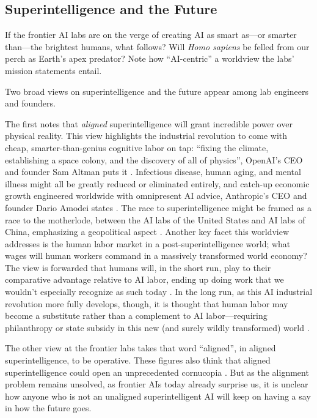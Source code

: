 \subsection{Superintelligence and the Future}
If the frontier AI labs are on the verge of creating AI as smart as---or
smarter than---the brightest humans, what follows? Will \emph{Homo sapiens} be
felled from our perch as Earth's apex predator? Note how ``AI-centric'' a
worldview the labs' mission statements entail.

Two broad views on superintelligence and the future appear among lab engineers
and founders.

The first notes that \emph{aligned} superintelligence will grant incredible
power over physical reality. This view highlights the industrial revolution to
come with cheap, smarter-than-genius cognitive labor on tap: ``fixing the
climate, establishing a space colony, and the discovery of all of physics'',
OpenAI's CEO and founder Sam Altman puts it \cite{altman2024intelligence}.
Infectious disease, human aging, and mental illness might all be greatly
reduced or eliminated entirely, and catch-up economic growth engineered
worldwide with omnipresent AI advice, Anthropic's CEO and founder Dario Amodei
states \cite{amodei2024grace}. The race to superintelligence might be framed as
a race to the motherlode, between the AI labs of the United States and AI labs
of China, emphasizing a geopolitical aspect
\cite{aschenbrenner2024situational,amodei2024grace}. Another key facet this
worldview addresses is the human labor market in a post-superintelligence
world; what wages will human workers command in a massively transformed world
economy? The view is forwarded that humans will, in the short run, play to
their comparative advantage relative to AI labor, ending up doing work that we
wouldn't especially recognize as such today
\cite{altman2024intelligence,amodei2024grace}. In the long run, as this AI
industrial revolution more fully develops, though, it is thought that human
labor may become a substitute rather than a complement to AI labor---requiring
philanthropy or state subsidy in this new (and surely wildly transformed) world
\cite{amodei2024grace}.

The other view at the frontier labs takes that word ``aligned'', in aligned
superintelligence, to be operative. These figures also think that aligned
superintelligence could open an unprecedented cornucopia
\cite{bostrom2014superintelligence,bostrom2024utopia}. But as the alignment
problem remains unsolved, as frontier AIs today already surprise us, it is
unclear how anyone who is not an unaligned superintelligent AI will keep on
having a say in how the future goes.
